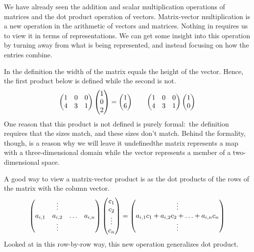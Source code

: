 We have already seen the addition and scalar multiplication
operations of matrices and  
the dot product operation of vectors. 
Matrix-vector multiplication is a new operation in the arithmetic of 
vectors and matrices.
Nothing in  requires us to view
it in terms of representations.
We can get some insight into this operation 
by turning away from  what is being represented, and instead focusing on
how the entries combine.

\begin{example}
In the definition
the width of the matrix equals the height of the vector.
Hence, the first product below is defined while the second is not. 
\begin{equation*}
    \begin{pmatrix}
      1  &0  &0  \\
      4  &3  &1
    \end{pmatrix}
  \begin{pmatrix} 1 \\ 0 \\ 2 \end{pmatrix}
  =
  \begin{pmatrix} 1 \\ 6 \end{pmatrix}
  \qquad
    \begin{pmatrix}
      1  &0  &0  \\
      4  &3  &1
    \end{pmatrix}
  \begin{pmatrix} 1 \\ 0 \end{pmatrix}
\end{equation*}
One reason that this product is not defined is purely formal:~the
definition requires that the sizes match, and these sizes don't match.
Behind the formality, though, 
is a reason why we will leave it undefined\Dash the
matrix represents a map with a three-dimensional domain while the 
vector represents a member of a two-dimensional space.
\end{example}

A good way to view a matrix-vector product is
as the dot products of the rows of the matrix with the column vector.
\begin{equation*}
    \begin{pmatrix}
               &\vdots                         \\
      a_{i,1}  &a_{i,2}  &\ldots   &a_{i,n}    \\
               &\vdots
    \end{pmatrix}
  \begin{pmatrix} c_1 \\ c_2 \\ \vdots \\ c_n \end{pmatrix}
  =
  \begin{pmatrix} \vdots \\ a_{i,1}c_1+a_{i,2}c_2+\ldots+a_{i,n}c_n \\ \vdots \end{pmatrix}
\end{equation*}
Looked at in this row-by-row way,
this new operation generalizes dot product.

